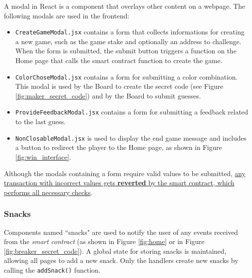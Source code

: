 {A modal in React is a component that overlays other content on a webpage. The following modals are used in the frontend:
\ns
\begin{itemize}
    \item \texttt{CreateGameModal.jsx} contains a form that collects informations for creating a new game, such as the game stake and optionally an address to challenge. When the form is submitted, the submit button triggers a function on the Home page that calls the smart contract function to create the game.
    \item \texttt{ColorChoseModal.jsx} contains a form for submitting a color combination. This modal is used by the  Board to create the secret code (see Figure \ref{fig:maker_secret_code}) and by the  Board to submit guesses.
    \item \texttt{ProvideFeedbackModal.jsx} contains a form for submitting a feedback related to the last guess.
    \item \texttt{NonClosableModal.jsx} is used to display the end game message and includes a button to redirect the player to the Home page, as shown in Figure \ref{fig:win_interface}.
\end{itemize}}

Although the modals containing a form require valid values to be submitted, \ul{any transaction with incorrect values gets \textbf{reverted} by the smart contract, which performs all necessary checks}.

\subsubsection{Snacks}
\label{sec:snacks}

Components named ``snacks" are used to notify the user of any events received from the \textit{smart contract} (as shown in Figure \ref{fig:home} or in Figure \ref{fig:breaker_secret_code}). A global state for storing snacks is maintained, allowing all pages to add a new snack. Only the handlers create new snacks by calling the \texttt{addSnack()} function.

